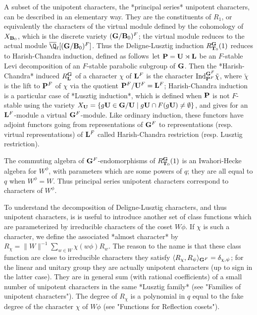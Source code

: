 A  subset  of  the  unipotent  characters, the *principal series* unipotent
characters,   can  be  described  in  an   elementary  way.  They  are  the
constituents of $R_1$, or equivalently the characters of the virtual module
defined  by the  cohomology of  $X_{{\bf B}_0}$, which  is the discrete variety
$({\bf G}/{\bf B}_0)^F$;   the  virtual   module  reduces   to  the  actual  module
$\overline\Q_\ell[(\bG/\bB_0)^F]$.   Thus  the   Deligne-Lusztig  induction
$R_{{\bf T}_0}^{\bf G}(1)$   reduces  to   Harish-Chandra  induction,   defined  as
follows\:\  let ${\bf P}={\bf U}\rtimes{\bf L}$ be an  $F$-stable Levi decomposition of
an  $F$-stable  parabolic  subgroup  of  ${\bf G}$.  Then  the *Harish-Chandra*
induced $R_{\bf L}^{\bf G}$ of a character $\chi$ of ${\bf L}^F$ is the character
$\text{Ind}_{{\bf P}^F}^{{\bf G}^F}\tilde\chi$,  where $\tilde\chi$ is  the lift to
${\bf P}^F$  of  $\chi$  via  the  quotient ${\bf P}^F/{\bf U}^F={\bf L}^F$; Harish-Chandra
induction  is a  particular case  of *Lusztig  induction*, which is defined
when  ${\bf P}$ is  not $F$-stable  using the  variety $X_{\bf U}=\{ g{\bf U}\in{\bf G}/{\bf U}
\mid  g{\bf U}\cap F(g{\bf U})\ne\emptyset\}$,  and gives  for an  ${\bf L}^F$-module a
virtual  ${\bf G}^F$-module.  Like  ordinary  induction,  these  functors  have
adjoint  functors going from representations  of ${\bf G}^F$ to representations
(resp.   virtual   representations)   of   ${\bf L}^F$   called  Harish-Chandra
restriction (resp. Lusztig restriction).

The  commuting algebra of ${\bf G}^F$-endomorphisms of $R_{{\bf T}_0}^{\bf G}(1)$ is an
Iwahori-Hecke  algebra for $W^\phi$, with  parameters which are some powers
of  $q$; they are all equal to  $q$ when $W^\phi=W$. Thus principal series
unipotent characters correspond to characters of $W^\phi$.

To  understand the  decomposition of  Deligne-Lusztig characters,  and thus
unipotent  characters,  is  is  useful  to  introduce  another set of class
functions  which are  parameterized by  irreducible characters  of the coset
$W\phi$.  If $\chi$ is  such a character,  we define the associated *almost
character* by\: $R_\chi=\|W\|^{-1}\sum_{w\in W}\chi(w\phi) R_w$. The reason
to  the  name  is  that  these  class  function  are  close  to irreducible
characters\: they satisfy $\langle R_\chi,
R_\psi\rangle_{{\bf G}^F}=\delta_{\chi,\psi}$; for the linear and unitary group
they  are actually  unipotent characters  (up to  sign in the latter case).
They  are in general sum (with rational  coefficients) of a small number of
unipotent  characters  in  the  same  *Lusztig  family*  (see  "Families of
unipotent characters"). The degree of $R_\chi$ is a polynomial in $q$ equal
to  the fake degree of the character  $\chi$ of $W\phi$ (see "Functions for
Reflection cosets").


